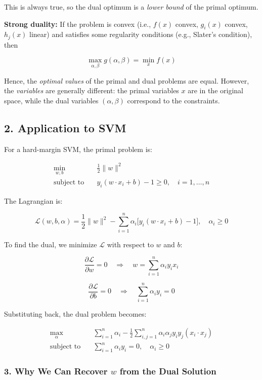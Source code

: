 This is always true, so the dual optimum is a \emph{lower bound} of the primal optimum.

\textbf{Strong duality:} If the problem is convex (i.e., $f(x)$ convex, $g_i(x)$ convex, $h_j(x)$ linear) and satisfies some regularity conditions (e.g., Slater's condition), then

\[
\max_{\alpha, \beta} g(\alpha, \beta) = \min_x f(x)
\]

Hence, the \emph{optimal values} of the primal and dual problems are equal.  
However, the \emph{variables} are generally different: the primal variables $x$ are in the original space, while the dual variables $(\alpha, \beta)$ correspond to the constraints.

\subsection*{2. Application to SVM}

For a hard-margin SVM, the primal problem is:

\[
\begin{aligned}
\min_{w,b} \quad & \frac{1}{2} \|w\|^2 \\
\text{subject to} \quad & y_i (w \cdot x_i + b) - 1 \ge 0, \quad i=1,\dots,n
\end{aligned}
\]

The Lagrangian is:

\[
\mathcal{L}(w,b,\alpha) = \frac{1}{2}\|w\|^2 - \sum_{i=1}^n \alpha_i \big[y_i (w \cdot x_i + b) - 1\big], 
\quad \alpha_i \ge 0
\]

To find the dual, we minimize $\mathcal{L}$ with respect to $w$ and $b$:

\[
\frac{\partial \mathcal{L}}{\partial w} = 0 \quad \Rightarrow \quad w = \sum_{i=1}^n \alpha_i y_i x_i
\]

\[
\frac{\partial \mathcal{L}}{\partial b} = 0 \quad \Rightarrow \quad \sum_{i=1}^n \alpha_i y_i = 0
\]

Substituting back, the dual problem becomes:

\[
\begin{aligned}
\max_{\alpha} \quad & \sum_{i=1}^n \alpha_i - \frac{1}{2} \sum_{i,j=1}^n \alpha_i \alpha_j y_i y_j (x_i \cdot x_j) \\
\text{subject to} \quad & \sum_{i=1}^n \alpha_i y_i = 0, \quad \alpha_i \ge 0
\end{aligned}
\]

\subsubsection*{3. Why We Can Recover $w$ from the Dual Solution}

